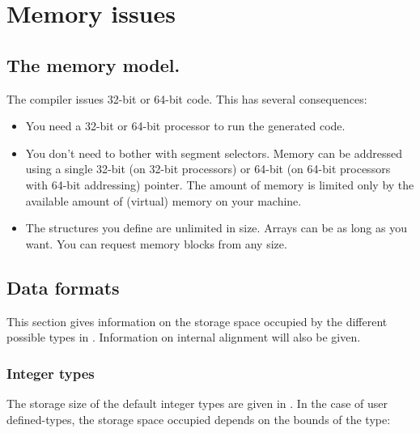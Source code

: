 \chapter{Memory issues}
\label{ch:Memory}

\section{The memory model.}
\label{se:ThirtytwoBit}
The \fpc compiler issues 32-bit or 64-bit code.
This has several consequences:
\begin{itemize}
\item You need a 32-bit or 64-bit processor to run the generated code. 
\item You don't need to bother with segment selectors. Memory can be
addressed using a single 32-bit (on 32-bit processors) or 64-bit (on
64-bit processors with 64-bit addressing) pointer.
The amount of memory is limited only by the available amount of (virtual)
memory on your machine.
\item The structures you define are unlimited in size. Arrays can be as long
as you want. You can request memory blocks from any size.
\end{itemize}

\section{Data formats}
\label{se:Dataformats}

This section gives information on the storage space occupied by
the different possible types in \fpc. Information on internal
alignment will also be given.

\subsection{Integer types}

The storage size of the default integer types are given in
. In the case of user defined-types, the storage space
occupied depends on the bounds of the type:

